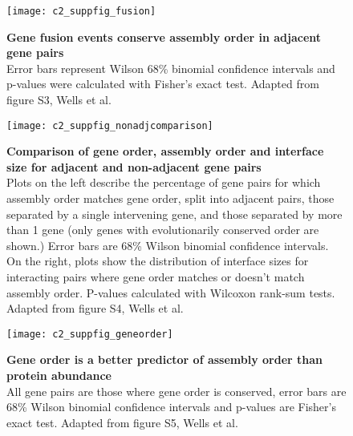 \documentclass[a4paper,11pt,twoside,openright]{scrbook}
\begin{document}
\begin{figure} \texttt{[image: c2\_suppfig\_fusion]} \caption[Gene fusion events
    conserve assembly order in adjacent gene pairs]{\sffamily \textbf{Gene
    fusion events conserve assembly order in adjacent gene pairs} \\ \small
    Error bars represent Wilson 68\% binomial confidence intervals and p-values
    were calculated with Fisher's exact test. Adapted from figure S3, Wells et
    al. \cite{Wells2016}} \label{suppfigure:fusion} \end{figure}

\begin{figure} \texttt{[image: c2\_suppfig\_nonadjcomparison]} \caption[Comparison
    of gene order, assembly order and interface size for adjacent and
    non-adjacent gene pairs]{\sffamily \textbf{Comparison of gene order,
    assembly order and interface size for adjacent and non-adjacent gene pairs}
    \\ \small Plots on the left describe the percentage of gene pairs for which
    assembly order matches gene order, split into adjacent pairs, those
    separated by a single intervening gene, and those separated by more than 1
    gene (only genes with evolutionarily conserved order are shown.) Error bars
    are 68\% Wilson binomial confidence intervals. On the right, plots show the
    distribution of interface sizes for interacting pairs where gene order
    matches or doesn't match assembly order. P-values calculated with Wilcoxon
    rank-sum tests. Adapted from figure S4, Wells et al. \cite{Wells2016}}
\label{suppfigure:nonadjcomparison} \end{figure}

\begin{figure} \texttt{[image: c2\_suppfig\_geneorder]} \caption[Gene order is a
    better predictor of assembly order than protein abundance]{\sffamily
    \textbf{Gene order is a better predictor of assembly order than protein
    abundance} \\ \small All gene pairs are those where gene order is conserved,
    error bars are 68\% Wilson binomial confidence intervals and p-values are
    Fisher's exact test. Adapted from figure S5, Wells et al. \cite{Wells2016}}
\label{suppfigure:geneorder} \end{figure}
\end{document}

